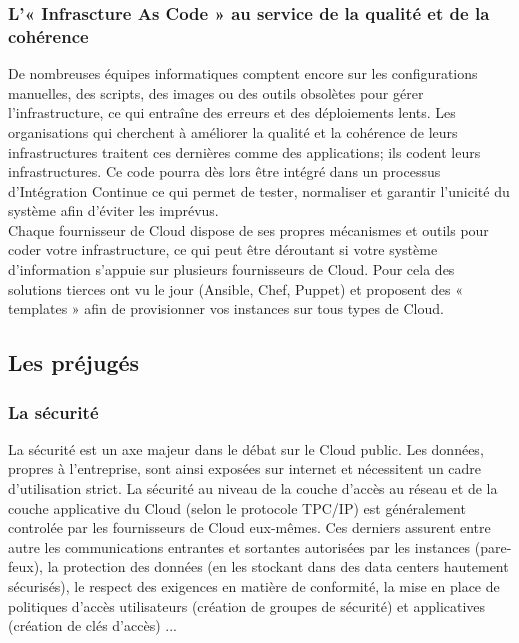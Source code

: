         \subsubsection{L'« Infrascture As Code » au service de la qualité et de la cohérence}
        De nombreuses équipes informatiques comptent encore sur les configurations manuelles, des scripts, des images ou des outils obsolètes pour gérer l'infrastructure, ce qui entraîne des erreurs et des déploiements lents. Les organisations qui cherchent à améliorer la qualité et la cohérence de leurs infrastructures traitent ces dernières comme des applications; ils codent leurs infrastructures. Ce code pourra dès lors être intégré dans un processus d'Intégration Continue ce qui permet de tester, normaliser et garantir l'unicité du système afin d'éviter les imprévus.\\

        Chaque fournisseur de Cloud dispose de ses propres mécanismes et outils pour coder votre infrastructure, ce qui peut être déroutant si votre système d'information s'appuie sur plusieurs fournisseurs de Cloud. Pour cela des solutions tierces ont vu le jour (Ansible, Chef, Puppet) et proposent des « templates » afin de provisionner vos instances sur tous types de Cloud.

      \subsection{Les préjugés}
        \subsubsection{La sécurité}
        La sécurité est un axe majeur dans le débat sur le Cloud public. Les données, propres à l'entreprise, sont ainsi exposées sur internet et nécessitent un cadre d'utilisation strict. La sécurité au niveau de la couche d'accès au réseau et de la couche applicative du Cloud (selon le protocole TPC/IP) est généralement controlée par les fournisseurs de Cloud eux-mêmes. Ces derniers assurent entre autre les communications entrantes et sortantes autorisées par les instances (pare-feux), la protection des données (en les stockant dans des data centers hautement sécurisés), le respect des exigences en matière de conformité, la mise en place de politiques d'accès utilisateurs (création de groupes de sécurité) et applicatives (création de clés d'accès) ...


